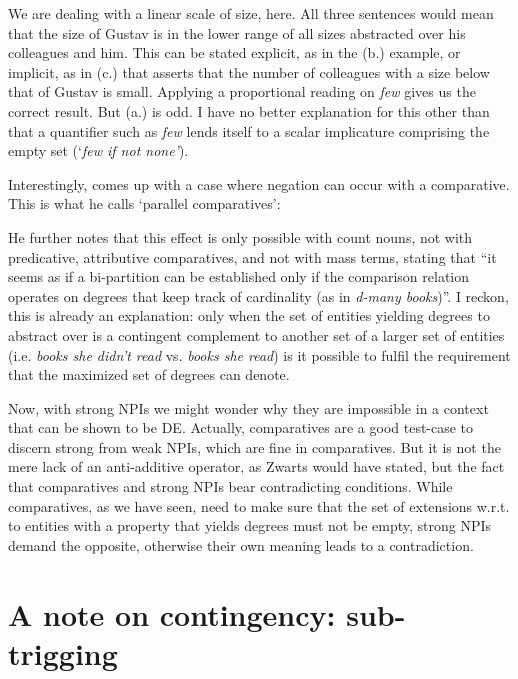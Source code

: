 \documentclass[output=paper,colorlinks,citecolor=brown,
]{langscibook}
\begin{document}
We are dealing with a linear scale of size, here. All three sentences would mean that the size of Gustav is in the
lower range of all sizes abstracted over his colleagues and him. This can be stated explicit, as in the (b.) example,
or implicit, as in (c.) that asserts that the number of colleagues with a size below that of Gustav is small. Applying
a proportional reading on \textit{few} gives us the correct result. But (a.) is odd. I have no better explanation for
this other than that a quantifier such as \textit{few} lends itself to a scalar implicature comprising the empty set
(`\textit{few if not none'}).

Interestingly, \citet[12]{lechner2002} comes up with a case where negation can occur with a comparative. This is what
he calls `parallel comparatives':

\begin{exe}
\end{exe}

He further notes that this effect is only possible with count nouns, not with predicative, attributive comparatives,
and not with mass terms, stating that ``it seems as if a bi-partition can be established only if the comparison
relation operates on degrees that keep track of cardinality (as in \textit{d-many books})''. I reckon, this is already
an explanation: only when the set of entities yielding degrees to abstract over is a contingent complement to another
set of a larger set of entities (i.e. \textit{books she didn't read} vs. \textit{books she read}) is it possible to
fulfil the requirement that the maximized set of degrees can denote.

Now, with strong NPIs we might wonder why they are impossible in a context that can be shown to be DE. Actually,
comparatives are a good test-case to discern strong from weak NPIs, which are fine in comparatives. But it is not the
mere lack of an anti-additive operator, as Zwarts would have stated, but the fact that comparatives and strong NPIs
bear contradicting conditions. While comparatives, as we have seen, need to make sure that the set of extensions w.r.t.
to entities with a property that yields degrees must not be empty, strong NPIs demand the opposite, otherwise their
own meaning leads to a contradiction.

\section{A note on contingency: sub-trigging}
\end{document}
